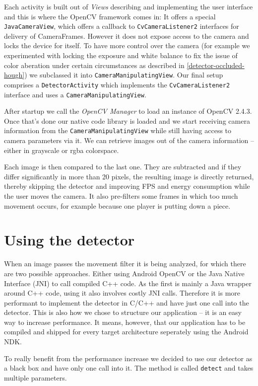	Each activity is built out of \textit{Views} describing and implementing the user interface and this is where the OpenCV framework comes in: It offers a special \texttt{JavaCameraView}, which offers a callback to \texttt{CvCameraListener2} interfaces for delivery of CameraFrames. However it does not expose access to the camera and locks the device for itself. To have more control over the camera (for example we experimented with locking the exposure and white balance to fix the issue of color aberation under certain circumstances as described in \ref{detector-occluded-hough}) we subclassed it into \texttt{CameraManipulatingView}. Our final setup comprises a \texttt{DetectorActivity} which implements the \texttt{CvCameraListener2} interface and uses a \texttt{CameraManipulatingView}.

	After startup we call the \textit{OpenCV Manager} to load an instance of OpenCV 2.4.3. Once that's done our native code library is loaded and we start receiving camera information from the \texttt{CameraManipulatingView} while still having access to camera parameters via it. We can retrieve images out of the camera information -- either in grayscale or rgba colorspace.

	Each image is then compared to the last one. They are subtracted and if they differ significantly in more than 20 pixels, the resulting image is directly returned, thereby skipping the detector and improving FPS and energy consumption while the user moves the camera. It also pre-filters some frames in which too much movement occurs, for example because one player is putting down a piece.

	\section{Using the detector}
	\label{android-detector}
	When an image passes the movement filter it is being analyzed, for which there are two possible approaches. Either using Android OpenCV or the Java Native Interface (JNI) to call compiled C++ code. As the first is mainly a Java wrapper around C++ code, using it also involves costly JNI calls. Therefore it is more performant to implement the detector in C/C++ and have just one call into the detector. This is also how we chose to structure our application -- it is an easy way to increase performance. It means, however, that our application has to be compiled and shipped for every target architecture seperately using the Android NDK.

	To really benefit from the performance increase we decided to use our detector as a black box and have only one call into it. The method is called \texttt{detect} and takes multiple parameters.

